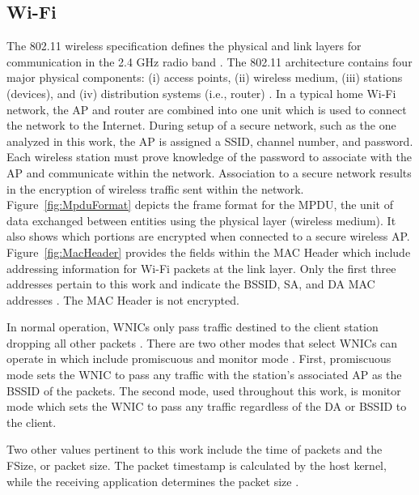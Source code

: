 \documentclass[12pt,letterpaper,oneside]{book}
\begin{document}
			\subsection{Wi-Fi}
			The 802.11 wireless specification defines the physical and link layers for communication in the 2.4 GHz radio band \cite{802.11}. The 802.11 architecture contains four major physical components: (i) access points, (ii) wireless medium, (iii) stations (devices), and (iv) distribution systems (i.e., router) \cite{kurose}. In a typical home Wi-Fi network, the \ac{AP} and router are combined into one unit which is used to connect the network to the Internet. During setup of a secure network, such as the one analyzed in this work, the \ac{AP} is assigned a \ac{SSID}, channel number, and password. Each wireless station must prove knowledge of the password to associate with the \ac{AP} and communicate within the network. Association to a secure network results in the encryption of wireless traffic sent within the network. Figure~\ref{fig:MpduFormat} depicts the frame format for the \ac{MPDU}, the unit of data exchanged between entities using the physical layer (wireless medium). It also shows which portions are encrypted when connected to a secure wireless \ac{AP}. Figure~\ref{fig:MacHeader} provides the fields within the \ac{MAC} Header which include addressing information for Wi-Fi packets at the link layer. Only the first three addresses pertain to this work and indicate the \ac{BSSID}, \ac{SA}, and \ac{DA} \ac{MAC} addresses \cite{802.11}. The \ac{MAC} Header is not encrypted.
			
			\figMpduFormat
			\figMacHeader
			
			In normal operation, \ac{WNIC}s only pass traffic destined to the client station dropping all other packets \cite{kurose}. There are two other modes that select \ac{WNIC}s can operate in which include promiscuous and monitor mode \cite{skoudisCounter}. First, promiscuous mode sets the \ac{WNIC} to pass any traffic with the station's associated \ac{AP} as the \ac{BSSID} of the packets. The second mode, used throughout this work, is monitor mode which sets the \ac{WNIC} to pass any traffic regardless of the \ac{DA} or \ac{BSSID} to the client.
			
			Two other values pertinent to this work include the time of packets and the \ac{FSize}, or packet size. The packet timestamp is calculated by the host kernel, while the receiving application determines the packet size \cite{tcpdump}.
			
\end{document}
